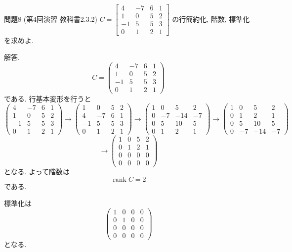 \documentclass[dvipdfmx,a4paper,11pt]{article} %
\theoremstyle{definition}
\begin{document}
問題8 (第4回演習 教科書2.3.2)
$
C=
\begin{bmatrix}
4 & -7 & 6 & 1\\
1 & 0 & 5 & 2\\
-1 & 5 & 5 & 3\\
0 & 1 & 2 & 1
\end{bmatrix}
 $
 の行簡約化, 階数, 標準化を求めよ. 
 
 解答. 
\[
C=
\begin{pmatrix}
4&-7&6&1\\
1&0&5&2\\
-1&5&5&3\\
0&1&2&1
\end{pmatrix}
\]
である. 行基本変形を行うと
\[
\begin{pmatrix}
4&-7&6&1\\
1&0&5&2\\
-1&5&5&3\\
0&1&2&1
\end{pmatrix}
\to
\begin{pmatrix}
1&0&5&2\\
4&-7&6&1\\
-1&5&5&3\\
0&1&2&1
\end{pmatrix}
\to
\begin{pmatrix}
1&0&5&2\\
0&-7&-14&-7\\
0&5&10&5\\
0&1&2&1
\end{pmatrix}
\to
\begin{pmatrix}
1&0&5&2\\
0&1&2&1\\
0&5&10&5\\
0&-7&-14&-7
\end{pmatrix}
\]
\[
\to
\boxed{
\begin{pmatrix}
1&0&5&2\\
0&1&2&1\\
0&0&0&0\\
0&0&0&0
\end{pmatrix}}
\]
となる. よって階数は
\[
\boxed{\operatorname{rank}C=2}
\]
である.

標準化は
\[
\boxed{
\begin{pmatrix}
1&0&0&0\\
0&1&0&0\\
0&0&0&0\\
0&0&0&0
\end{pmatrix}}
\]
となる.
\end{document}
